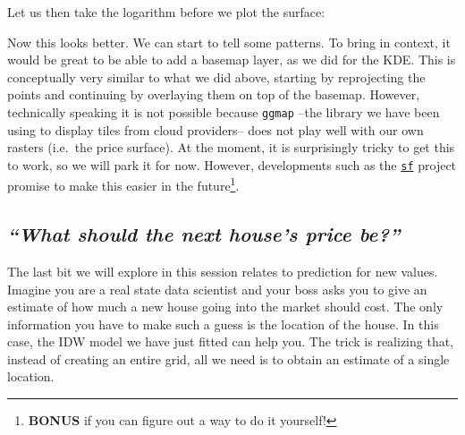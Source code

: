 \documentclass[
]{book}
\newenvironment{Shaded}{\begin{snugshade}}{\end{snugshade}}
\newcommand{\DataTypeTok}[1]{\textcolor[rgb]{0.13,0.29,0.53}{#1}}
\newcommand{\KeywordTok}[1]{\textcolor[rgb]{0.13,0.29,0.53}{\textbf{#1}}}
\newcommand{\NormalTok}[1]{#1}
\newcommand{\OperatorTok}[1]{\textcolor[rgb]{0.81,0.36,0.00}{\textbf{#1}}}
\newcommand{\StringTok}[1]{\textcolor[rgb]{0.31,0.60,0.02}{#1}}
\begin{document}
Let us then take the logarithm before we plot the surface:

\begin{Shaded}
\end{Shaded}

Now this looks better. We can start to tell some patterns. To bring in context, it would be great to be able to add a basemap layer, as we did for the KDE. This is conceptually very similar to what we did above, starting by reprojecting the points and continuing by overlaying them on top of the basemap. However, technically speaking it is not possible because \texttt{ggmap} --the library we have been using to display tiles from cloud providers-- does not play well with our own rasters (i.e.~the price surface). At the moment, it is surprisingly tricky to get this to work, so we will park it for now. However, developments such as the \href{https://github.com/edzer/sfr}{\texttt{sf}} project promise to make this easier in the future\footnote{\textbf{BONUS} if you can figure out a way to do it yourself!}.

\hypertarget{what-should-the-next-houses-price-be}{%
\subsection{\texorpdfstring{\emph{``What should the next house's price be?''}}{``What should the next house's price be?''}}\label{what-should-the-next-houses-price-be}}

The last bit we will explore in this session relates to prediction for new values. Imagine you are a real state data scientist and your boss asks you to give an estimate of how much a new house going into the market should cost. The only information you have to make such a guess is the location of the house. In this case, the IDW model we have just fitted can help you. The trick is realizing that, instead of creating an entire grid, all we need is to obtain an estimate of a single location.
\end{document}
